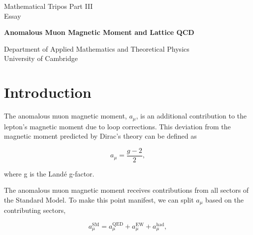\documentclass{article}
\numberwithin{equation}{section} %
\begin{document}
\begin{titlepage}
\begin{center}
\vspace*{1cm}
Mathematical Tripos Part III\\Essay
\vspace{0.5cm}

{\LARGE \textbf{Anomalous Muon Magnetic Moment and Lattice QCD}}
\vspace{3cm}

\vspace{1cm}
\vspace{7cm}
Department of Applied Mathematics and Theoretical Physics\\
University of Cambridge\\


\end{center}
\end{titlepage}

\newcommand{\amu}{$a_\mu$ }

\tableofcontents

\newpage

\section{Introduction}\label{intro}
The anomalous muon magnetic moment, $a_\mu$, is an additional contribution to the lepton's magnetic moment due to loop corrections. This deviation from the magnetic moment predicted by Dirac's theory can be defined as\cite{lehnerg2}

\begin{equation}
a_\mu = \frac{g-2}{2},
\label{amu}
\end{equation}

\noindent where g is the Land\'e g-factor.  

The anomalous muon magnetic moment receives contributions from all sectors of the Standard Model. To make this point manifest, we can split \amu based on the contributing sectors\cite{hoecker},

\begin{equation}
a^{\mathrm{SM}}_\mu= a_\mu^{\mathrm{QED}} + a_\mu^{\mathrm{EW}} + a_\mu^{\mathrm{had}},
\label{asm}
\end{equation}
\end{document}
